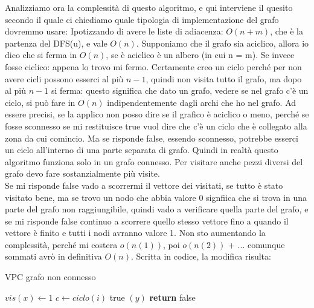Analizziamo ora la complessità di questo algoritmo, e qui interviene il quesito secondo il quale ci chiediamo quale tipologia di implementazione del grafo dovremmo usare:
Ipotizzando di avere le liste di adiacenza: $O(n+m)$, che è la partenza del DFS(u), e vale $O(n)$. Supponiamo che il grafo sia aciclico, allora io dico che si ferma in $O(n)$, se è aciclico è un albero (in cui n = m). Se invece fosse ciclico: appena lo trovo mi fermo. Certamente creo un ciclo perché per non avere cicli possono esserci al più $n-1$, quindi non visita tutto il grafo, ma dopo al più $n-1$ si ferma: questo significa che dato un grafo, vedere se nel grafo c'è un ciclo, si può fare in $O(n)$ indipendentemente dagli archi che ho nel grafo. Ad essere precisi, se la applico non posso dire se il grafico è aciclico o meno, perché se fosse sconnesso se mi restituisce true vuol dire che c'è un ciclo che è collegato alla zona da cui comincio. Ma se risponde false, essendo sconnesso, potrebbe esserci un ciclo all'interno di una parte separata di grafo. Quindi in realtà questo algoritmo funziona solo in un grafo connesso. Per visitare anche pezzi diversi del grafo devo fare sostanzialmente più visite. \\

Se mi risponde false vado a scorrermi il vettore dei visitati, se tutto è stato visitato bene, ma se trovo un nodo che abbia valore 0 signfiica che si trova in una parte del grafo non raggiungibile, quindi vado a verificare quella parte del grafo, e se mi risponde false continuo a scorrere quello stesso vettore fino a quando il vettore è finito e tutti i nodi avranno valore 1. Non sto aumentando la complessità, perché mi costera $o(n(1))$, poi $o(n(2))$ + ... comunque sommati avrò in definitiva $O(n)$. Scritta in codice, la modifica risulta:

\begin{algorithm}
    \caption{VPC grafo non connesso}\label{alg:VPCnC}
    \begin{algorithmic}[1]
            \State ${vis}(x) \gets 1$ 
             \Comment{}
                 $c \gets {ciclo}(i) $
                \EndIf
                    \Return true $(y)$ \Comment{}
                \EndIf
            \EndFor
            \State \textbf{return} false\Comment{}
        \EndFunction
    \end{algorithmic}
\end{algorithm}

